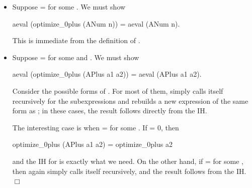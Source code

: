 \documentclass[12pt]{report}
\begin{document}
\begin{itemize}
\item  Suppose  =   for some .  We must show


          aeval (optimize\_0plus (ANum n)) = aeval (ANum n).


        This is immediate from the definition of .



\item  Suppose  =    for some  and .  We must
        show


          aeval (optimize\_0plus (APlus a1 a2)) = aeval (APlus a1 a2).


        Consider the possible forms of .  For most of them,
         simply calls itself recursively for the
        subexpressions and rebuilds a new expression of the same form
        as ; in these cases, the result follows directly from the
        IH.


        The interesting case is when  =   for some .  If
         = 0, then


          optimize\_0plus (APlus a1 a2) = optimize\_0plus a2


        and the IH for  is exactly what we need.  On the other
        hand, if  =   for some , then again 
        simply calls itself recursively, and the result follows from
        the IH.  \ensuremath{\Box} 
\end{itemize}
\end{document}
